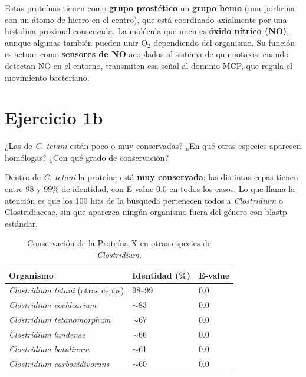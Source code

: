 Estas proteínas tienen como \textbf{grupo prostético} un \textbf{grupo hemo} (una porfirina
con un átomo de hierro en el centro), que está coordinado axialmente por una histidina proximal
conservada. La molécula que unen es \textbf{óxido nítrico (NO)}, aunque algunas también pueden
unir O$_2$ dependiendo del organismo. Su función es actuar como \textbf{sensores de NO}
acoplados al sistema de quimiotaxis: cuando detectan NO en el entorno, transmiten esa señal al
dominio MCP, que regula el movimiento bacteriano.

\section{Ejercicio 1b}

\begin{consigna}
¿Las de \textit{C. tetani} están poco o muy conservadas? ¿En qué otras especies aparecen
homólogas? ¿Con qué grado de conservación?
\end{consigna}

Dentro de \textit{C. tetani} la proteína está \textbf{muy conservada}: las distintas cepas
tienen entre 98 y 99\% de identidad, con E-value 0.0 en todos los casos. Lo que llama la
atención es que los 100 hits de la búsqueda pertenecen todos a \textit{Clostridium} o
Clostridiaceae, sin que aparezca ningún organismo fuera del género con blastp estándar.

\begin{table}[H]
\centering
\footnotesize
\begin{tabular}{lP{2.5cm}P{2.5cm}}
\toprule
Organismo & Identidad (\%) & E-value \\
\midrule
\textit{Clostridium tetani} (otras cepas) & 98--99 & 0.0 \\
\textit{Clostridium cochlearium}           & $\sim$83 & 0.0 \\
\textit{Clostridium tetanomorphum}         & $\sim$67 & 0.0 \\
\textit{Clostridium lundense}              & $\sim$66 & 0.0 \\
\textit{Clostridium botulinum}             & $\sim$61 & 0.0 \\
\textit{Clostridium carboxidivorans}       & $\sim$60 & 0.0 \\
\bottomrule
\end{tabular}
\caption{Conservación de la Proteína X en otras especies de \textit{Clostridium}.}
\end{table}


